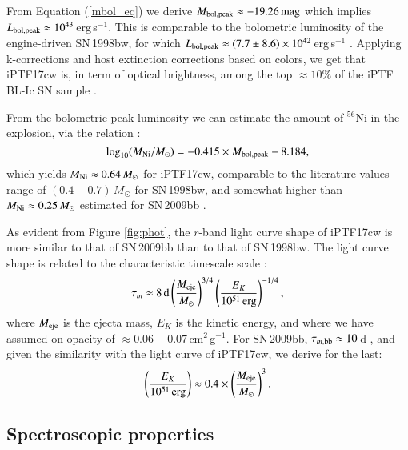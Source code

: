\documentclass[twocolumn]{emulateapj}
\begin{document}
From Equation (\ref{mbol_eq}) we derive $M_{\rm bol,peak}\approx-19.26\,{\rm mag}$ which implies $L_{\rm bol,peak}\approx 10^{43}$\,erg\,s$^{-1}$. This is comparable to the bolometric luminosity of the engine-driven SN\,1998bw, for which $L_{\rm bol,peak}\approx (7.7\pm8.6)\times10^{42}$\,erg\,s$^{-1}$ \citep[see Table 3 in][]{Clocchiatti2011}. Applying k-corrections and host extinction corrections based on colors, we get that iPTF17cw is, in term of optical brightness, among the top $\approx 10\%$ of the iPTF BL-Ic SN sample \citep{Taddia2017}.

From the bolometric peak luminosity we can estimate the amount of $^{56}$Ni in the explosion, via the relation \citep[e.g.,][]{Arnett1982,Lyman2016}:
\begin{equation}
\log_{10}(M_{\rm Ni}/M_{\odot})=-0.415\times M_{\rm bol,peak}-8.184,
\end{equation}
which yields $M_{\rm Ni}\approx 0.64\,M_{\odot}$ for iPTF17cw, comparable to the literature values range of $(0.4-0.7)\,M_{\odot}$ for SN\,1998bw, and somewhat higher than $M_{\rm Ni}\approx 0.25\,M_{\odot}$ estimated for SN\,2009bb \citep[see Table 5 in][]{Lyman2016}. 

As evident from Figure \ref{fig:phot}, the $r$-band light curve shape of iPTF17cw is more similar to that of SN\,2009bb \citep{Pignata2011} than to that of SN\,1998bw. The light curve shape is related to the characteristic  timescale scale \citep[e.g.,][]{Arnett1982,Lyman2016}: 
\begin{equation}
\tau_m\approx 8\,{\rm d}\left(\frac{M_{\rm eje}}{M_{\odot}}\right)^{3/4}\left(\frac{E_K}{10^{51}\,\rm erg}\right)^{-1/4},
\end{equation}
where $M_{\rm eje}$ is the ejecta mass, $E_K$ is the kinetic energy, and where we have assumed on opacity of $\approx 0.06-0.07$\,cm$^2$\,g$^{-1}$. For SN\,2009bb,  $\tau_{m,\rm bb}\approx 10$\,d \citep{Lyman2016}, and given the similarity with the light curve of iPTF17cw, we derive for the last:
\begin{equation}
\left(\frac{E_K}{10^{51}\,\rm erg}\right)\approx0.4\times\left(\frac{M_{\rm eje}}{M_{\odot}}\right)^{3}.
\label{paraeq1}
\end{equation}


\subsection{Spectroscopic properties}
\end{document}
